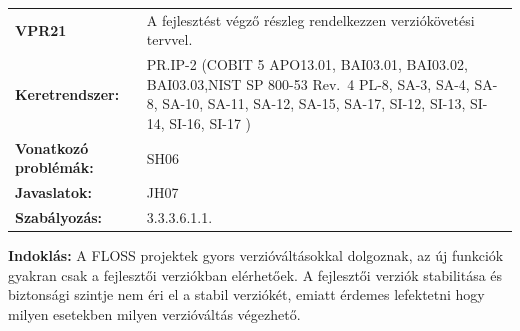 \documentclass[12pt,magyar,a4paper,oneside]{scrreprt}
\begin{document}
\begin{longtable}[]{@{}ll@{}}
\toprule
\endhead
\begin{minipage}[t]{0.16\columnwidth}\raggedright
\textbf{VPR21}\strut
\end{minipage} & \begin{minipage}[t]{0.79\columnwidth}\raggedright
A fejlesztést végző részleg rendelkezzen verziókövetési tervvel.\strut
\end{minipage}\tabularnewline
\begin{minipage}[t]{0.16\columnwidth}\raggedright
\textbf{Keretrendszer:}\strut
\end{minipage} & \begin{minipage}[t]{0.79\columnwidth}\raggedright
PR.IP-2 (COBIT 5 APO13.01, BAI03.01, BAI03.02, BAI03.03,NIST SP 800-53
Rev.~4 PL-8, SA-3, SA-4, SA-8, SA-10, SA-11, SA-12, SA-15, SA-17, SI-12,
SI-13, SI-14, SI-16, SI-17 )\strut
\end{minipage}\tabularnewline
\begin{minipage}[t]{0.16\columnwidth}\raggedright
\textbf{Vonatkozó problémák:}\strut
\end{minipage} & \begin{minipage}[t]{0.79\columnwidth}\raggedright
SH06\strut
\end{minipage}\tabularnewline
\begin{minipage}[t]{0.16\columnwidth}\raggedright
\textbf{Javaslatok:}\strut
\end{minipage} & \begin{minipage}[t]{0.79\columnwidth}\raggedright
JH07\strut
\end{minipage}\tabularnewline
\begin{minipage}[t]{0.16\columnwidth}\raggedright
\textbf{Szabályozás:}\strut
\end{minipage} & \begin{minipage}[t]{0.79\columnwidth}\raggedright
3.3.3.6.1.1.\strut
\end{minipage}\tabularnewline
\bottomrule
\end{longtable}

\textbf{Indoklás: } A FLOSS projektek gyors verzióváltásokkal dolgoznak,
az új funkciók gyakran csak a fejlesztői verziókban elérhetőek. A
fejlesztői verziók stabilitása és biztonsági szintje nem éri el a stabil
verziókét, emiatt érdemes lefektetni hogy milyen esetekben milyen
verzióváltás végezhető.
\end{document}

